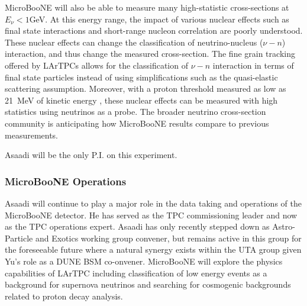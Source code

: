 MicroBooNE will also be able to measure many high-statistic cross-sections at $E_{\nu} < 1$GeV. At this energy range, the impact of various nuclear effects such as final state interactions and short-range nucleon correlation are poorly understood. These nuclear effects can change the classification of neutrino-nucleus ($\nu-n$) interaction, and thus change the measured cross-section. The fine grain tracking offered by LArTPCs allows for the classification of $\nu-n$ interaction in terms of final state particles instead of using simplifications such as the quasi-elastic scattering assumption. Moreover, with a proton threshold measured as low as 21~MeV of kinetic energy \cite{Argoneut}, these nuclear effects can be measured with high statistics using neutrinos as a probe. The broader neutrino cross-section community is anticipating how MicroBooNE results compare to previous measurements.

Asaadi will be the only P.I. on this experiment.


\subsubsection{MicroBooNE Operations}\label{sec:UbooneOperations}
Asaadi will continue to play a major role in the data taking and operations of the MicroBooNE detector.  He has served as the TPC commissioning leader and now as the TPC operations expert. Asaadi has only recently stepped down as Astro-Particle and Exotics working group convener, but remains active in this group for the foreseeable future where a natural synergy exists within the UTA group given Yu's role as a DUNE BSM co-onvener. MicroBooNE will explore the physics capabilities of LArTPC including classification of low energy events as a background for supernova neutrinos and searching for cosmogenic backgrounds related to proton decay analysis.

